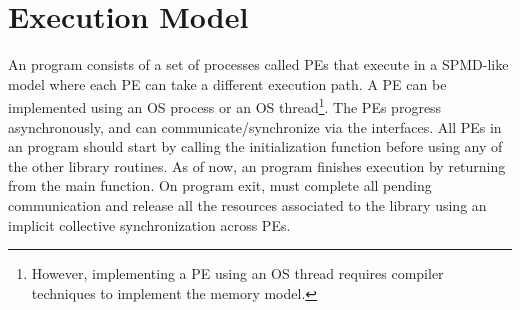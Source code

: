 \section{Execution Model}
\label{subsec:execution_model}

An \openshmem{} program consists of a set of \openshmem{} processes called \ac{PE}s that execute in a \ac{SPMD}-like model where each \ac{PE} can take a different execution path. A \ac{PE} can be implemented using an OS process or an OS thread\footnote{However, implementing a \ac{PE} using an OS thread requires compiler techniques to implement the \openshmem{} memory model.}.
The \ac{PE}s progress asynchronously, and can communicate/synchronize 
via the \openshmem{} interfaces. All \ac{PE}s in an \openshmem{} program should start by calling the initialization function  before using any of the other \openshmem{} library routines. As of now, an \openshmem program finishes execution by returning from the main function. On program exit, \openshmem must complete all pending communication and release all the resources associated to the library using an implicit collective synchronization across \ac{PE}s.

